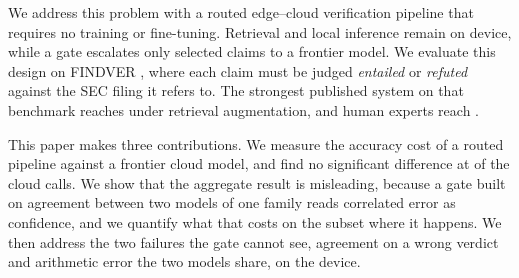 \documentclass{article}
\begin{document}
We address this problem with a routed edge--cloud verification pipeline that requires no training or fine-tuning. Retrieval and local inference remain on device, while a gate escalates only selected claims to a frontier model. We evaluate this design on FINDVER \citep{zhao2024findver}, where each claim must be judged \emph{entailed} or \emph{refuted} against the SEC filing it refers to. The strongest published system on that benchmark reaches \pubBestRAG{} under retrieval augmentation, and human experts reach \pubHumanExpert{}.

This paper makes three contributions. We measure the accuracy cost of a routed pipeline against a frontier cloud model, and find no significant difference at \escRate{} of the cloud calls. We show that the aggregate result is misleading, because a gate built on agreement between two models of one family reads correlated error \citep{kim2025correlated} as confidence, and we quantify what that costs on the subset where it happens. We then address the two failures the gate cannot see, agreement on a wrong verdict and arithmetic error the two models share, on the device.






\end{document}

